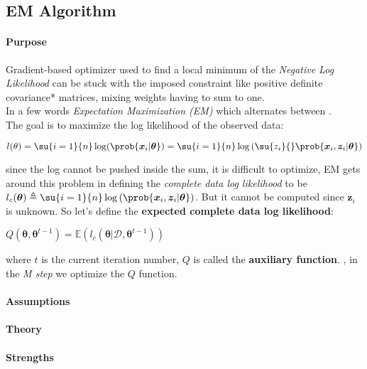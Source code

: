 \subsection{EM Algorithm}
\paragraph{Purpose}
Gradient-based optimizer used to find a local minimum of the \emph{Negative Log 
Likelihood} can be stuck with the imposed constraint like positive definite covariance*
matrices, mixing weights having to sum to one.\\
In a few words \emph{Expectation Maximization (EM)} which alternates between .\\
The goal is to maximize the log likelihood of the observed data:
\begin{center}
    $l(\theta) = \su{i=1}{n}\log(\prob{\bm{x}_{i}|\bm{\theta}}) = 
    \su{i=1}{n}\log\left(\su{z_{i}}{}\prob{\bm{x}_{i},\bm{z}_{i}|\bm{\theta}}\right)
    $
\end{center}
since the log cannot be pushed inside the sum, it is difficult to optimize, EM gets 
around this problem in defining the \emph{complete data log likelihood} to be
$l_c(\bm{\theta}) \triangleq \su{i=1}{n}\log\left(\prob{\bm{x}_{i},\bm{z}_{i}|
\bm{\theta}}\right)$. But it cannot be computed since $\bm{z}_{i}$ is unknown. So let's
define the \textbf{expected complete data log likelihood}:
\begin{center}
    $Q(\bm{\theta}, \bm{\theta}^{t-1}) = \mathbb{E}\left(l_{c}(\bm{\theta}|\mathcal{D},
    \bm{\theta}^{t-1})\right)$
\end{center}
where $t$ is the current iteration number, $Q$ is called the \textbf{auxiliary 
function}. , in the \emph{M step} we optimize the $Q$ function.


\paragraph{Assumptions}
\paragraph{Theory}
\paragraph{Strengths}
